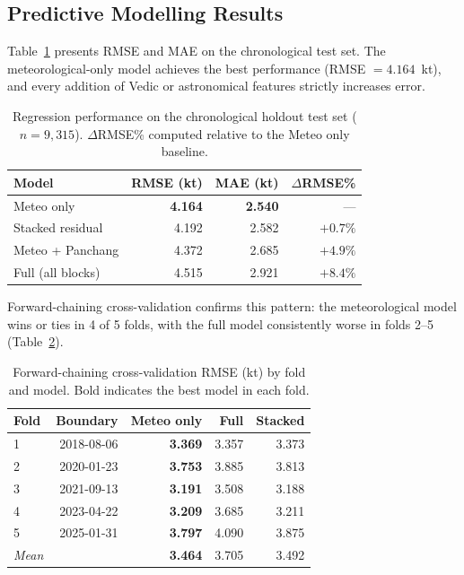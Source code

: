 \documentclass[12pt,a4paper]{article}
\begin{document}
    \subsection{Predictive Modelling Results}

    Table~\ref{tab:rmse} presents RMSE and MAE on the chronological test set.
    The meteorological-only model achieves the best performance
    (RMSE $= 4.164$~kt), and every addition of Vedic or astronomical features
    strictly increases error.

    \begin{table}[H]
    \centering
    \caption{Regression performance on the chronological holdout test set
    ($n = 9{,}315$). $\Delta$RMSE\% computed relative to the Meteo only baseline.}
    \label{tab:rmse}
    \begin{tabular}{lrrr}
        \toprule
        \textbf{Model} & \textbf{RMSE (kt)} & \textbf{MAE (kt)} & \boldmath$\Delta$\textbf{RMSE\%} \\
        \midrule
        Meteo only            & \textbf{4.164} & \textbf{2.540} & --- \\
        Stacked residual      & 4.192 & 2.582 & $+0.7\%$ \\
        Meteo + Panchang      & 4.372 & 2.685 & $+4.9\%$ \\
        Full (all blocks)     & 4.515 & 2.921 & $+8.4\%$ \\
        \bottomrule
    \end{tabular}
    \end{table}

    Forward-chaining cross-validation confirms this pattern: the meteorological
    model wins or ties in 4 of 5 folds, with the full model consistently worse
    in folds 2--5 (Table~\ref{tab:cv}).

    \begin{table}[H]
    \centering
    \caption{Forward-chaining cross-validation RMSE (kt) by fold and model.
    Bold indicates the best model in each fold.}
    \label{tab:cv}
    \begin{tabular}{lrrrr}
        \toprule
        \textbf{Fold} & \textbf{Boundary} & \textbf{Meteo only} & \textbf{Full} & \textbf{Stacked} \\
        \midrule
        1 & 2018-08-06 & \textbf{3.369} & 3.357 & 3.373 \\
        2 & 2020-01-23 & \textbf{3.753} & 3.885 & 3.813 \\
        3 & 2021-09-13 & \textbf{3.191} & 3.508 & 3.188 \\
        4 & 2023-04-22 & \textbf{3.209} & 3.685 & 3.211 \\
        5 & 2025-01-31 & \textbf{3.797} & 4.090 & 3.875 \\
        \midrule
        \textit{Mean} & & \textbf{3.464} & 3.705 & 3.492 \\
        \bottomrule
    \end{tabular}
    \end{table}
\end{document}
